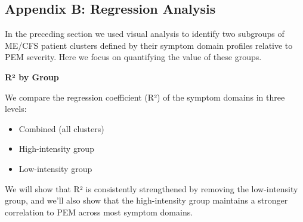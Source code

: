 \documentclass[
  letterpaper,
  DIV=11,
  numbers=noendperiod]{scrartcl}
\providecommand{\tightlist}{%
  \setlength{\itemsep}{0pt}\setlength{\parskip}{0pt}}
\begin{document}
\FloatBarrier

\subsection*{Appendix B: Regression Analysis}\label{sec-regression}

In the preceding section we used visual analysis to identify two
subgroups of ME/CFS patient clusters defined by their symptom domain
profiles relative to PEM severity. Here we focus on quantifying the
value of these groups.

\textbf{R² by Group}

We compare the regression coefficient (R²) of the symptom domains in
three levels:

\begin{itemize}
\tightlist
\item
  Combined (all clusters)
\item
  High-intensity group
\item
  Low-intensity group
\end{itemize}

We will show that R² is consistently strengthened by removing the
low-intensity group, and we'll also show that the high-intensity group
maintains a stronger correlation to PEM across most symptom domains.
\FloatBarrier

\begin{table}

\caption{\label{tbl-t2}R² by Domain}


\end{table}%
\end{document}
